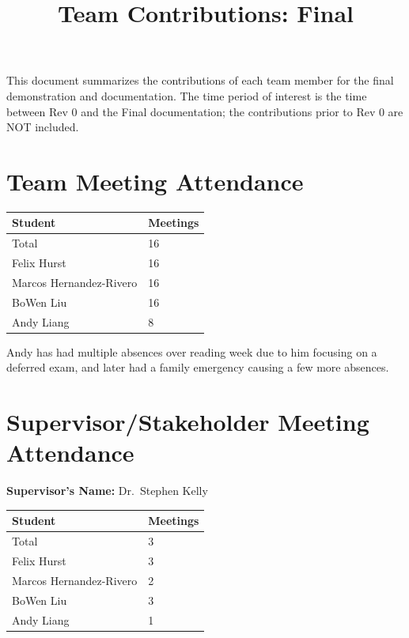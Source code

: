 \documentclass{article}
\title{Team Contributions: Final\\\progname}
\author{\authname}
\date{}
\begin{document}
\maketitle

This document summarizes the contributions of each team member for the final
demonstration and documentation.  The time period of interest is the time
between Rev 0 and the Final documentation; the contributions prior to Rev 0 are
NOT included.

\section{Team Meeting Attendance}

\begin{table}[H]
\centering
\begin{tabular}{ll}
\toprule
\textbf{Student} & \textbf{Meetings}\\
\midrule
Total & 16\\
Felix Hurst & 16\\
Marcos Hernandez-Rivero & 16\\
BoWen Liu & 16\\
Andy Liang & 8\\
\bottomrule
\end{tabular}
\end{table}

Andy has had multiple absences over reading week due to him focusing on a deferred
exam, and later had a family emergency causing a few more absences.

\newpage

\section{Supervisor/Stakeholder Meeting Attendance}

\noindent \textbf{Supervisor's Name: } Dr.\ Stephen Kelly

\begin{table}[H]
\centering
\begin{tabular}{ll}
\toprule
\textbf{Student} & \textbf{Meetings}\\
\midrule
Total & 3\\
Felix Hurst & 3\\
Marcos Hernandez-Rivero & 2\\
BoWen Liu & 3\\
Andy Liang & 1\\
\bottomrule
\end{tabular}
\end{table}
\end{document}
